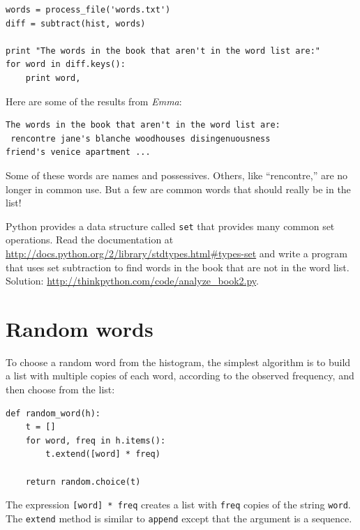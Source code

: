 \documentclass[10pt]{book}
\begin{document}
\begin{verbatim}
words = process_file('words.txt')
diff = subtract(hist, words)

print "The words in the book that aren't in the word list are:"
for word in diff.keys():
    print word,
\end{verbatim}
%
Here are some of the results from {\em Emma}:

\begin{verbatim}
The words in the book that aren't in the word list are:
 rencontre jane's blanche woodhouses disingenuousness
friend's venice apartment ...
\end{verbatim}
%
Some of these words are names and possessives.  Others, like
``rencontre,'' are no longer in common use.  But a few are common
words that should really be in the list!

\begin{exercise}

Python provides a data structure called {\tt set} that provides many
common set operations.  Read the documentation at
\url{http://docs.python.org/2/library/stdtypes.html#types-set} and
write a program that uses set subtraction to find words in the book
that are not in the word list.  Solution:
\url{http://thinkpython.com/code/analyze_book2.py}.

\end{exercise}


\section{Random words}
\label{randomwords}

To choose a random word from the histogram, the simplest algorithm
is to build a list with multiple copies of each word, according
to the observed frequency, and then choose from the list:

\begin{verbatim}
def random_word(h):
    t = []
    for word, freq in h.items():
        t.extend([word] * freq)

    return random.choice(t)
\end{verbatim}
%
The expression {\tt [word] * freq} creates a list with {\tt freq}
copies of the string {\tt word}.  The {\tt extend}
method is similar to {\tt append} except that the argument is
a sequence.
\end{document}
